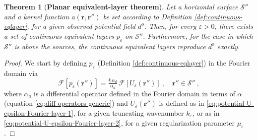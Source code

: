\documentclass[manuscript,noblind]{geophysics}
\newtheorem{theorem}{Theorem}
\begin{document}
	\begin{theorem}[\textbf{Planar equivalent-layer theorem}]
		\label{theorem:planar-eqlayer-theorem}
		Let a horizontal surface $\mathcal{S}''$ and a kernel function $a(\mathbf{r}, \mathbf{r}'')$ 
		be set according to Definition \ref{def:continuous-eqlayer}, for a given observed potential field $d^{o}$. 
		Then, for every $\varepsilon > 0$, there exists a set of continuous equivalent layers $p_{\varepsilon}$ on $\mathcal{S}''$. 
		Furthermore, for the case in which $\mathcal{S}''$ is above the sources, the continuous equivalent layers 
		reproduce $d^{o}$ exactly.
	\end{theorem}
	\begin{proof}
		We start by defining $p_{\varepsilon}$ (Definition \ref{def:continuous-eqlayer}) 
		in the Fourier domain via
		\begin{equation}
			\mathcal{F} [ p_{\varepsilon}(\mathbf{r}'') ] =
			\tfrac{k \, \alpha_{d}}{\alpha_{a}} \,
			\mathcal{F} [ U_{\varepsilon}(\mathbf{r}'') ] \: ,
			\quad \mathbf{r}'' \in \mathcal{S}'' \: ,
			\label{eq:p-Fourier}
		\end{equation}
		where $\alpha_{a}$ is a differential operator 
		defined in the Fourier domain in terms of $\alpha$ (equation \ref{eq:diff-operators-generic}) and
		$U_{\varepsilon}(\mathbf{r}'')$ is defined as in \ref{eq:potential-U-epsilon-Fourier-layer-1},
		for a given truncating wavenumber $k_{\varepsilon}$, or as in \ref{eq:potential-U-epsilon-Fourier-layer-2},
		for a given regularization parameter $\mu_{\varepsilon}$. 
		

\end{proof}
\end{document}
